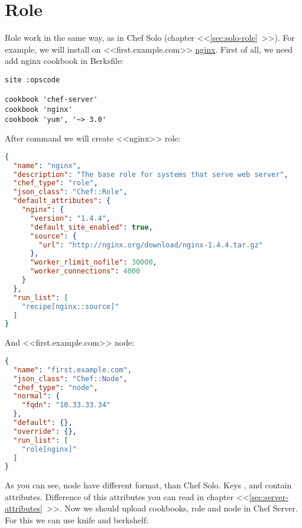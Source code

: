 \section{Role}

Role work in the same way, as in Chef Solo (chapter <<\ref{sec:solo-role}~>>). For example, we will install on <<first.example.com>> \href{http://community.opscode.com/cookbooks/nginx}{nginx}. First of all, we need add nginx cookbook in Berksfile:

\begin{lstlisting}[label=lst:my-serer-cloud-role1,title=my-server-cloud/Berksfile]
site :opscode

cookbook 'chef-server'
cookbook 'nginx'
cookbook 'yum', '~> 3.0'
\end{lstlisting}

After command  we will create <<nginx>> role:

\begin{lstlisting}[language=JSON,label=lst:my-serer-cloud-role2,title=my-server-cloud/roles/nginx.json]
{
  "name": "nginx",
  "description": "The base role for systems that serve web server",
  "chef_type": "role",
  "json_class": "Chef::Role",
  "default_attributes": {
    "nginx": {
      "version": "1.4.4",
      "default_site_enabled": true,
      "source": {
        "url": "http://nginx.org/download/nginx-1.4.4.tar.gz"
      },
      "worker_rlimit_nofile": 30000,
      "worker_connections": 4000
    }
  },
  "run_list": [
    "recipe[nginx::source]"
  ]
}
\end{lstlisting}

And <<first.example.com>> node:

\begin{lstlisting}[language=JSON,label=lst:my-serer-cloud-role3,title=my-server-cloud/nodes/first.example.com.json]
{
  "name": "first.example.com",
  "json_class": "Chef::Node",
  "chef_type": "node",
  "normal": {
    "fqdn": "10.33.33.34"
  },
  "default": {},
  "override": {},
  "run_list": [
    "role[nginx]"
  ]
}
\end{lstlisting}

As you can see, node have different format, than Chef Solo. Keys ,  and  contain attributes. Difference of this attributes you can read in chapter <<\ref{sec:server-attributes}~>>. Now we should upload cookbooks, role and node in Chef Server. For this we can use knife and berkshelf:

